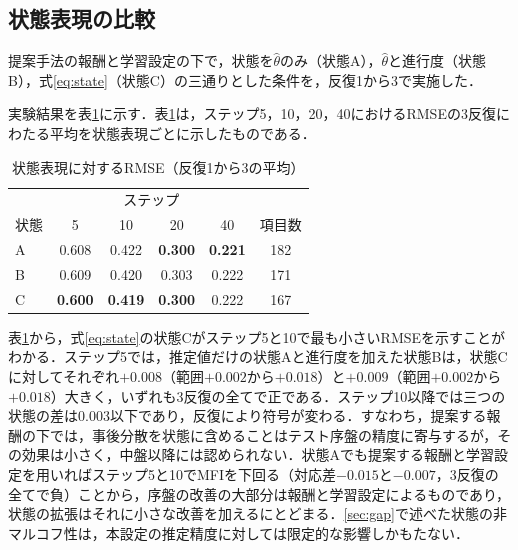 \documentclass[paper]{ieicej}
\begin{document}
\subsection{状態表現の比較}\label{sec:stateexp}

提案手法の報酬と学習設定の下で，状態を$\hat\theta$のみ（状態A），$\hat\theta$と進行度（状態B），式\eqref{eq:state}（状態C）の三通りとした条件を，反復1から3で実施した．

実験結果を表\ref{tab:state}に示す．表\ref{tab:state}は，ステップ5，10，20，40におけるRMSEの3反復にわたる平均を状態表現ごとに示したものである．

\begin{table}[t]
\centering
\caption{状態表現に対するRMSE（反復1から3の平均）}
\label{tab:state}
\footnotesize
\begin{tabular}{lccccc}
\hline
 & \multicolumn{4}{c}{ステップ} & \\
状態 & 5 & 10 & 20 & 40 & 項目数\\
\hline
A & 0.608 & 0.422 & \textbf{0.300} & \textbf{0.221} & 182\\
B & 0.609 & 0.420 & 0.303 & 0.222 & 171\\
C & \textbf{0.600} & \textbf{0.419} & \textbf{0.300} & 0.222 & 167\\
\hline
\end{tabular}
\end{table}

表\ref{tab:state}から，式\eqref{eq:state}の状態Cがステップ5と10で最も小さいRMSEを示すことがわかる．ステップ5では，推定値だけの状態Aと進行度を加えた状態Bは，状態Cに対してそれぞれ$+0.008$（範囲$+0.002$から$+0.018$）と$+0.009$（範囲$+0.002$から$+0.018$）大きく，いずれも3反復の全てで正である．ステップ10以降では三つの状態の差は0.003以下であり，反復により符号が変わる．すなわち，提案する報酬の下では，事後分散を状態に含めることはテスト序盤の精度に寄与するが，その効果は小さく，中盤以降には認められない．状態Aでも提案する報酬と学習設定を用いればステップ5と10でMFIを下回る（対応差$-0.015$と$-0.007$，3反復の全てで負）ことから，序盤の改善の大部分は報酬と学習設定によるものであり，状態の拡張はそれに小さな改善を加えるにとどまる．\ref{sec:gap}で述べた状態の非マルコフ性は，本設定の推定精度に対しては限定的な影響しかもたない．
\end{document}
